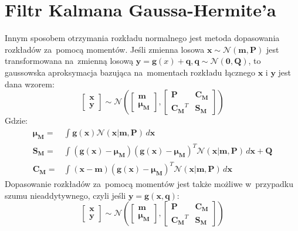 \section{Filtr Kalmana Gaussa-Hermite'a} \label{GHKF}
Innym sposobem otrzymania rozkładu normalnego jest metoda dopasowania rozkładów za~pomocą momentów. Jeśli zmienna losowa $\boldsymbol{x} \sim \mathcal{N}(\boldsymbol{m},\boldsymbol{P})$ jest transformowana na~zmienną losową $\boldsymbol{y}=\boldsymbol{g}(x)+\boldsymbol{q}, \boldsymbol{q} \sim \mathcal{N}(\boldsymbol{0},\boldsymbol{Q})$, to gaussowska aproksymacja bazująca na~momentach rozkładu łącznego $\boldsymbol{x}$ i $\boldsymbol{y}$ jest dana wzorem: \cite[96-99]{Sarka} 
\begin{equation} \label{eq:GaussianMomentMatchingAdditive}
	\begin{bmatrix}
	\boldsymbol{x} \\
	\boldsymbol{y}
	\end{bmatrix} \sim
	\mathcal{N}(
	\begin{bmatrix}
	\boldsymbol{m} \\
	\boldsymbol{\mu_M}
	\end{bmatrix},
	\begin{bmatrix}
	\boldsymbol{P} & \boldsymbol{C_M} \\
	\boldsymbol{C_M}^T & \boldsymbol{S_M}
	\end{bmatrix}
	)
\end{equation}
Gdzie:
\begin{align}\label{eq:GaussianMomentMatchingAdditiveWhere}
\boldsymbol{\mu_M} =& \int_{}^{}\boldsymbol{g}(\boldsymbol{x})\mathcal{N}(\boldsymbol{x}|\boldsymbol{m, \boldsymbol{P}}) \,d\boldsymbol{x} \nonumber \\
\boldsymbol{S_M}=&\int_{}^{}(\boldsymbol{g}(\boldsymbol{x}) - \boldsymbol{\mu_M})(\boldsymbol{g}(\boldsymbol{x}) - \boldsymbol{\mu_M})^T \mathcal{N}(\boldsymbol{x}|\boldsymbol{m, \boldsymbol{P}}) \,d\boldsymbol{x} + \boldsymbol{Q} \nonumber \\
\boldsymbol{C_M}=&\int_{}^{}(\boldsymbol{x} - \boldsymbol{m})(\boldsymbol{g}(\boldsymbol{x}) - \boldsymbol{\mu_M})^T \mathcal{N}(\boldsymbol{x}|\boldsymbol{m, \boldsymbol{P}}) \,d\boldsymbol{x}
\end{align}
Dopasowanie rozkładów za~pomocą momentów jest także możliwe w~przypadku szumu nieaddytywnego, czyli jeśli $\boldsymbol{y}=\boldsymbol{g}(\boldsymbol{x}, \boldsymbol{q})$:
\begin{equation} \label{eq:GaussianMomentMatchingNonAdditive}
\begin{bmatrix}
\boldsymbol{x} \\
\boldsymbol{y}
\end{bmatrix} \sim
\mathcal{N}(
\begin{bmatrix}
\boldsymbol{m} \\
\boldsymbol{\mu_M}
\end{bmatrix},
\begin{bmatrix}
\boldsymbol{P} & \boldsymbol{C_M} \\
\boldsymbol{C_M}^T & \boldsymbol{S_M}
\end{bmatrix}
)
\end{equation}
